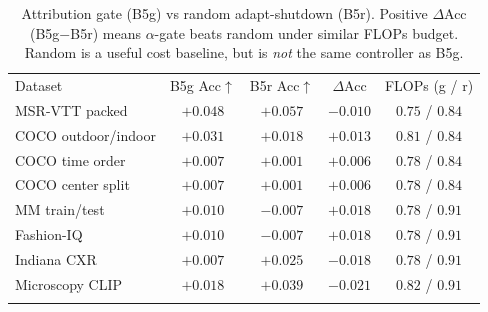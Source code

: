 \begin{table}[t]
\centering
\caption{Attribution gate (B5g) vs random adapt-shutdown (B5r).
Positive $\Delta$Acc (B5g$-$B5r) means $\alpha$-gate beats random under similar FLOPs budget.
Random is a useful cost baseline, but is \emph{not} the same controller as B5g.}
\label{tab:agod-b5g-vs-b5r}
\begin{tabular}{lcccc}
\agodtoprule
Dataset & B5g Acc$\uparrow$ & B5r Acc$\uparrow$ & $\Delta$Acc & FLOPs (g / r) \\
\agodmidrule
MSR-VTT packed      & $+0.048$ & $+0.057$ & $-0.010$ & $0.75$ / $0.84$ \\
COCO outdoor/indoor & $+0.031$ & $+0.018$ & $+0.013$ & $0.81$ / $0.84$ \\
COCO time order     & $+0.007$ & $+0.001$ & $+0.006$ & $0.78$ / $0.84$ \\
COCO center split   & $+0.007$ & $+0.001$ & $+0.006$ & $0.78$ / $0.84$ \\
MM train/test       & $+0.010$ & $-0.007$ & $+0.018$ & $0.78$ / $0.91$ \\
Fashion-IQ          & $+0.010$ & $-0.007$ & $+0.018$ & $0.78$ / $0.91$ \\
Indiana CXR         & $+0.007$ & $+0.025$ & $-0.018$ & $0.78$ / $0.91$ \\
Microscopy CLIP     & $+0.018$ & $+0.039$ & $-0.021$ & $0.82$ / $0.91$ \\
\agodbottomrule
\end{tabular}
\end{table}

